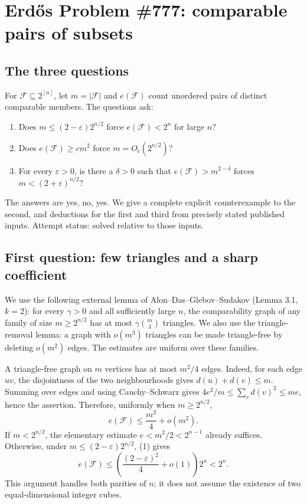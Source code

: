 \section*{Erd\H{o}s Problem \#777: comparable pairs of subsets}
\subsection*{The three questions}
For \(\mathcal F\subseteq2^{[n]}\), let \(m=|\mathcal F|\) and \(e(\mathcal F)\) count unordered pairs of distinct comparable members. The questions ask:
\begin{enumerate}
\item Does \(m\leq(2-\varepsilon)2^{n/2}\) force \(e(\mathcal F)<2^n\) for large \(n\)?
\item Does \(e(\mathcal F)\geq c m^2\) force \(m=O_c(2^{n/2})\)?
\item For every \(\varepsilon>0\), is there a \(\delta>0\) such that \(e(\mathcal F)>m^{2-\delta}\) forces \(m<(2+\varepsilon)^{n/2}\)?
\end{enumerate}
The answers are yes, no, yes. We give a complete explicit counterexample to the second, and deductions for the first and third from precisely stated published inputs. Attempt status: solved relative to those inputs.

\subsection*{First question: few triangles and a sharp coefficient}
We use the following external lemma of Alon--Das--Glebov--Sudakov (Lemma 3.1, \(k=2\)): for every \(\gamma>0\) and all sufficiently large \(n\), the comparability graph of any family of size \(m\geq2^{n/2}\) has at most \(\gamma\binom m3\) triangles. We also use the triangle-removal lemma: a graph with \(o(m^3)\) triangles can be made triangle-free by deleting \(o(m^2)\) edges. The estimates are uniform over these families.

A triangle-free graph on \(m\) vertices has at most \(m^2/4\) edges. Indeed, for each edge \(uv\), the disjointness of the two neighbourhoods gives \(d(u)+d(v)\leq m\). Summing over edges and using Cauchy--Schwarz gives \(4e^2/m\leq\sum_vd(v)^2\leq me\), hence the assertion.
Therefore, uniformly when \(m\geq2^{n/2}\),
\[
e(\mathcal F)\leq\frac{m^2}{4}+o(m^2). \tag{1}
\]
If \(m<2^{n/2}\), the elementary estimate \(e< m^2/2<2^{n-1}\) already suffices. Otherwise, under \(m\leq(2-\varepsilon)2^{n/2}\), (1) gives
\[
e(\mathcal F)\leq\left(\frac{(2-\varepsilon)^2}{4}+o(1)\right)2^n<2^n.
\]
This argument handles both parities of \(n\); it does not assume the existence of two equal-dimensional integer cubes.

